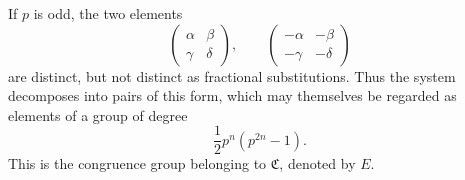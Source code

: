 \documentclass[11pt]{article}
\begin{document}
If $p$ is odd, the two elements
\begin{equation}
 \begin{pmatrix}\alpha&\beta\\\gamma&\delta\end{pmatrix},\qquad
 \begin{pmatrix}-\alpha&-\beta\\-\gamma&-\delta\end{pmatrix} \tag{5}
\end{equation}
are distinct, but not distinct as fractional substitutions. Thus the system decomposes into pairs of this form, which may themselves be regarded as elements of a group of degree
\begin{equation}
 \frac12 p^n(p^{2n}-1). \tag{6}
\end{equation}
This is the congruence group belonging to $\mathfrak C$, denoted by $E$.
\end{document}
